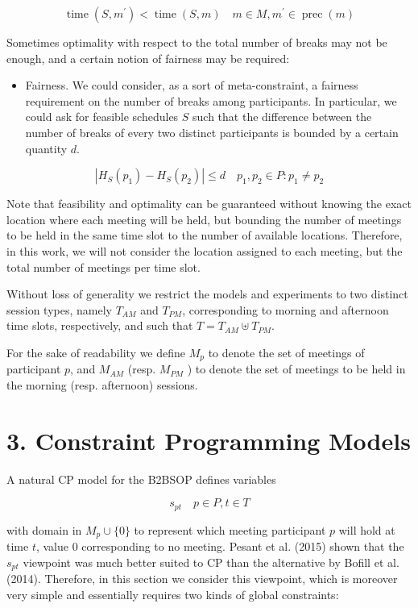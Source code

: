 \documentclass[10pt]{article}
\begin{document}
$$
\operatorname{time}\left(S, m^{\prime}\right)<\operatorname{time}(S, m) \quad m \in M, m^{\prime} \in \operatorname{prec}(m)
$$

Sometimes optimality with respect to the total number of breaks may not be enough, and a certain notion of fairness may be required:

\begin{itemize}
  \item Fairness. We could consider, as a sort of meta-constraint, a fairness requirement on the number of breaks among participants. In particular, we could ask for feasible schedules $S$ such that the difference between the number of breaks of every two distinct participants is bounded by a certain quantity $d$.
\end{itemize}

$$
\left|H_{S}\left(p_{1}\right)-H_{S}\left(p_{2}\right)\right| \leq d \quad p_{1}, p_{2} \in P: p_{1} \neq p_{2}
$$

Note that feasibility and optimality can be guaranteed without knowing the exact location where each meeting will be held, but bounding the number of meetings to be held in the same time slot to the number of available locations. Therefore, in this work, we will not consider the location assigned to each meeting, but the total number of meetings per time slot.

Without loss of generality we restrict the models and experiments to two distinct session types, namely $T_{A M}$ and $T_{P M}$, corresponding to morning and afternoon time slots, respectively, and such that $T=T_{A M} \uplus T_{P M}$.

For the sake of readability we define $M_{p}$ to denote the set of meetings of participant $p$, and $M_{A M}$ (resp. $M_{P M}$ ) to denote the set of meetings to be held in the morning (resp. afternoon) sessions.

\section*{3. Constraint Programming Models}
A natural CP model for the B2BSOP defines variables

$$
s_{p t} \quad p \in P, t \in T
$$

with domain in $M_{p} \cup\{0\}$ to represent which meeting participant $p$ will hold at time $t$, value 0 corresponding to no meeting. Pesant et al. (2015) shown that the $s_{p t}$ viewpoint was much better suited to CP than the alternative by Bofill et al. (2014). Therefore, in this section we consider this viewpoint, which is moreover very simple and essentially requires two kinds of global constraints:
\end{document}
